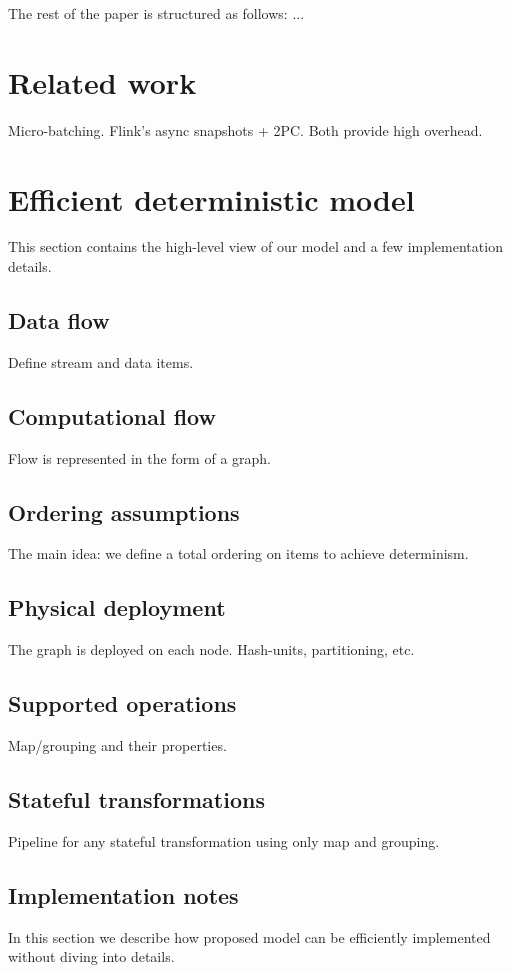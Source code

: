 \documentclass{llncs}
\begin{document}
The rest of the paper is structured as follows: ...

\section {Related work}
Micro-batching. Flink's async snapshots + 2PC. Both provide high overhead. 

\section {Efficient deterministic model}
This section contains the high-level view of our model and a few implementation details.

\subsection{Data flow}
Define stream and data items.

\subsection{Computational flow}
Flow is represented in the form of a graph.

\subsection{Ordering assumptions}
The main idea: we define a total ordering on items to achieve determinism.

\subsection{Physical deployment}
The graph is deployed on each node. Hash-units, partitioning, etc.

\subsection{Supported operations}
Map/grouping and their properties.

\subsection{Stateful transformations}
Pipeline for any stateful transformation using only map and grouping. 

\subsection{Implementation notes}
In this section we describe how proposed model can be efficiently implemented without diving into details.
\end{document}
